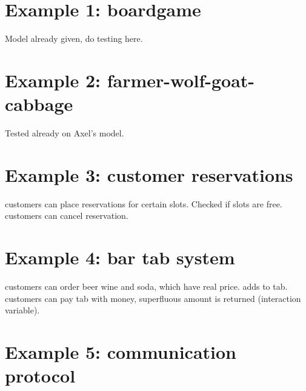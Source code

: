 \section{Example 1: boardgame}
Model already given, do testing here.

\section{Example 2: farmer-wolf-goat-cabbage}
Tested already on Axel's model.

\section{Example 3: customer reservations}
customers can place reservations for certain slots. Checked if slots are free. customers can cancel reservation.

\section{Example 4: bar tab system}
customers can order beer wine and soda, which have real price. adds to tab. customers can pay tab with money, superfluous amount is returned (interaction variable).

\section{Example 5: communication protocol}
